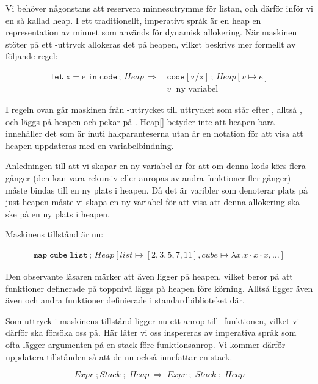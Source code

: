 \documentclass[../Core]{subfiles}
\begin{document}
Vi behöver någonstans att reservera minnesutrymme för listan, och därför
inför vi en så kallad heap. I ett traditionellt, imperativt språk är
en heap en representation av minnet som används för dynamisk allokering. När
maskinen stöter på ett -uttryck allokeras det på heapen, vilket
beskrivs mer formellt av följande regel:

\begin{align*}
\mathtt{let\;\mathrm{x\mathtt{=}e}\; in\; code}\,;\, Heap\,\Rightarrow\, & \mathtt{code[v/x]}\,;\, Heap[v\mapsto e] \\
 & v\; \text{ ny variabel} \nonumber
\end{align*}

I regeln ovan går maskinen från -uttrycket till
uttrycket som står efter , alltså ,
och  läggs på heapen och pekar på .
Heap{[}{]} betyder inte att heapen bara innehåller det som är inuti
hakparanteserna utan är en notation för att visa att heapen
uppdateras med en variabelbindning.

Anledningen till att vi skapar en ny variabel  är för att om
denna kods körs flera gånger (den kan vara rekursiv eller anropas av andra funktioner
fler gånger) måste  bindas till en ny plats i heapen. Då det är varibler som
denoterar plats på just heapen måste vi skapa en ny variabel för att visa att denna
allokering ska ske på en ny plats i heapen.

Maskinens tillstånd är nu:

\begin{align*}
\mathtt{map\; cube\; list}\,;\, Heap[list\mapsto[2,3,5,7,11],cube\mapsto\lambda x.x\cdot x\cdot x,\ldots]
\end{align*}


Den observante läsaren märker att även  ligger på heapen, vilket
beror på att funktioner definerade på toppnivå läggs på heapen före körning.
Alltså ligger även även  och andra funktioner definierade
i standardbiblioteket där.

Som uttryck i maskinens tillstånd ligger nu ett anrop till
-funktionen, vilket vi därför ska försöka oss på.
Här låter vi oss inspereras av imperativa språk som ofta lägger argumenten
på en stack före funktionsanrop. Vi kommer därför uppdatera tillstånden så att de
nu också innefattar en stack.

\begin{equation*} 
Expr \; ; Stack \; ; \; Heap \; \Rightarrow \; Expr \; ; \; Stack \; ; \; Heap
\end{equation*} 
\end{document}
